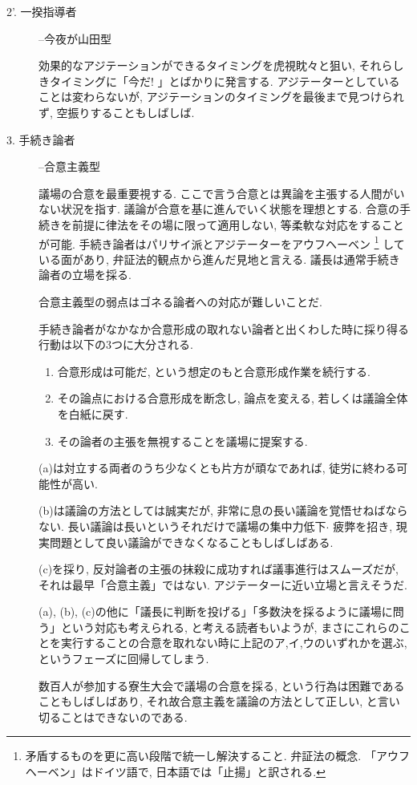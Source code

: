 \documentclass[10pt,b5jsbook,dvips,dvipdfmx,openany]{jsbook}
\theoremstyle{definition}
\begin{document}
\begin{description}
			\item[2'. 一揆指導者] --今夜が山田型

			効果的なアジテーションができるタイミングを虎視眈々と狙い, それらしきタイミングに「今だ! 」とばかりに発言する. アジテーターとしていることは変わらないが, アジテーションのタイミングを最後まで見つけられず, 空振りすることもしばしば. 

			\item[3. 手続き論者] --合意主義型

			議場の合意を最重要視する. ここで言う合意とは異論を主張する人間がいない状況を指す. 議論が合意を基に進んでいく状態を理想とする. 合意の手続きを前提に律法をその場に限って適用しない, 等柔軟な対応をすることが可能. 手続き論者はパリサイ派とアジテーターをアウフヘーベン \footnote{矛盾するものを更に高い段階で統一し解決すること. 弁証法の概念. 「アウフヘーベン」はドイツ語で, 日本語では「止揚」と訳される. } している面があり, 弁証法的観点から進んだ見地と言える. 議長は通常手続き論者の立場を採る. 

			合意主義型の弱点はゴネる論者への対応が難しいことだ. 

			手続き論者がなかなか合意形成の取れない論者と出くわした時に採り得る行動は以下の3つに大分される. 

			\begin{tcolorbox}

			\begin{enumerate}

			\renewcommand{\labelenumi}{(\alph{enumi})}

			\item 合意形成は可能だ, という想定のもと合意形成作業を続行する. 
			\item その論点における合意形成を断念し, 論点を変える, 若しくは議論全体を白紙に戻す. 
			\item その論者の主張を無視することを議場に提案する. 

			\end{enumerate}

			\end{tcolorbox}
			(a)は対立する両者のうち少なくとも片方が頑なであれば, 徒労に終わる可能性が高い. 

			(b)は議論の方法としては誠実だが, 非常に息の長い議論を覚悟せねばならない. 長い議論は長いというそれだけで議場の集中力低下$ \cdot $ 疲弊を招き, 現実問題として良い議論ができなくなることもしばしばある. 

			(c)を採り, 反対論者の主張の抹殺に成功すれば議事進行はスムーズだが, それは最早「合意主義」ではない. アジテーターに近い立場と言えそうだ. 

			(a), (b), (c)の他に「議長に判断を投げる」「多数決を採るように議場に問う」という対応も考えられる, と考える読者もいようが, まさにこれらのことを実行することの合意を取れない時に上記のア,イ,ウのいずれかを選ぶ, というフェーズに回帰してしまう. 

			数百人が参加する寮生大会で議場の合意を採る, という行為は困難であることもしばしばあり, それ故合意主義を議論の方法として正しい, と言い切ることはできないのである. 

			\end{description}
\end{document}
